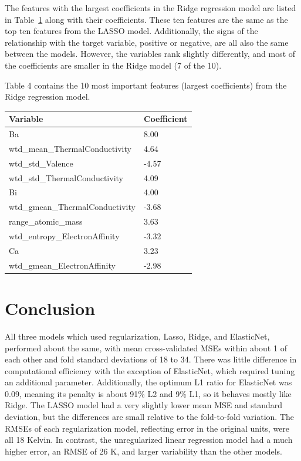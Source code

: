 \documentclass{article}
\begin{document}
The features with the largest coefficients in the Ridge regression model are listed in Table~\ref{table:ridge_coefficients} along with their coefficients. These ten features are the same as the top ten features from the LASSO model. Additionally, the signs of the relationship with the target variable, positive or negative, are all also the same between the models. However, the variables rank slightly differently, and most of the coefficients are smaller in the Ridge model (7 of the 10).

Table 4 contains the 10 most important features (largest coefficients) from the Ridge regression model.

\begin{table}[h!]
    \centering
    \begin{tabular}{|l|l|}
    \hline
    \textbf{Variable} & \textbf{Coefficient} \\ \hline \hline
    Ba & 8.00 \\ \hline
    wtd\_mean\_ThermalConductivity & 4.64 \\ \hline
    wtd\_std\_Valence & -4.57 \\ \hline
    wtd\_std\_ThermalConductivity & 4.09 \\ \hline
    Bi & 4.00 \\ \hline
    wtd\_gmean\_ThermalConductivity & -3.68 \\ \hline
    range\_atomic\_mass & 3.63 \\ \hline
    wtd\_entropy\_ElectronAffinity & -3.32 \\ \hline
    Ca & 3.23 \\ \hline
    wtd\_gmean\_ElectronAffinity & -2.98 \\ \hline
    \end{tabular}
    \label{table:ridge_coefficients}
\end{table}

\section{Conclusion}

All three models which used regularization, Lasso, Ridge, and ElasticNet, performed about the same, with mean cross-validated MSEs within about 1 of each other and fold standard deviations of 18 to 34. There was little difference in computational efficiency with the exception of ElasticNet, which required tuning an additional parameter. Additionally, the optimum L1 ratio for ElasticNet was 0.09, meaning its penalty is about 91\% L2 and 9\% L1, so it behaves mostly like Ridge. The LASSO model had a very slightly lower mean MSE and standard deviation, but the differences are small relative to the fold-to-fold variation. The RMSEs of each regularization model, reflecting error in the original units, were all 18 Kelvin. In contrast, the unregularized linear regression model had a much higher error, an RMSE of 26 K, and larger variability than the other models.
\end{document}
